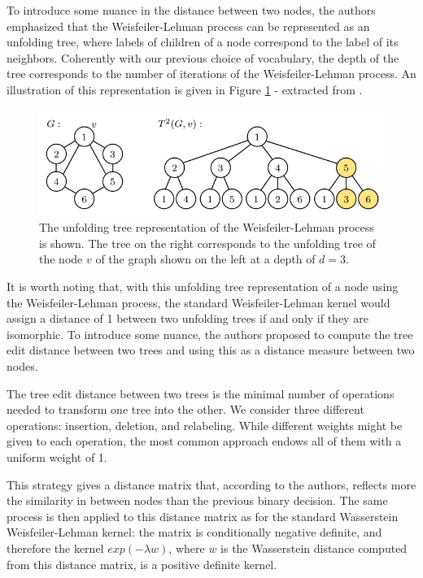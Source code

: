 \documentclass{IEEEtran}
\begin{document}
To introduce some nuance in the distance between two nodes, the authors emphasized that the Weisfeiler-Lehman process can be represented as an unfolding tree, where labels of children of a node correspond to the label of its neighbors. Coherently with our previous choice of vocabulary, the depth of the tree corresponds to the number of iterations of the Weisfeiler-Lehman process.
An illustration of this representation is given in Figure \ref{fig:unfolding} - extracted from \cite{schulz2022generalized}.

\begin{figure}[h]
    \centering
    \includegraphics[width=\linewidth]{wwl_unfolding_trees.jpg}
    \caption{The unfolding tree representation of the Weisfeiler-Lehman process is shown. The tree on the right corresponds to the unfolding tree of the node $v$ of the graph shown on the left at a depth of $d=3$.}
    \label{fig:unfolding}
\end{figure}


It is worth noting that, with this unfolding tree representation of a node using the Weisfeiler-Lehman process, the standard Weisfeiler-Lehman kernel would assign a distance of 1 between two unfolding trees if and only if they are isomorphic. To introduce some nuance, the authors proposed to compute the tree edit distance between two trees and using this as a distance measure between two nodes.

The tree edit distance between two trees is the minimal number of operations needed to transform one tree into the other. We consider three different operations: insertion, deletion, and relabeling. While different weights might be given to each operation, the most common approach endows all of them with a uniform weight of 1.

This strategy gives a distance matrix that, according to the authors, reflects more the similarity in between nodes than the previous binary decision. The same process is then applied to this distance matrix as for the standard Wasserstein Weisfeiler-Lehman kernel: the matrix is conditionally negative definite, and therefore the kernel $exp(- \lambda w)$,
where $w$ is the Wasserstein distance computed from this distance matrix, is a positive definite kernel.
\end{document}
